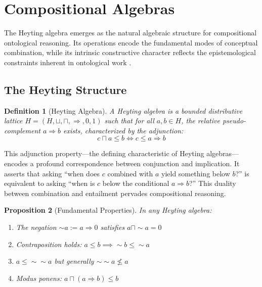 \documentclass[12pt,a4paper]{article}
\newtheorem{definition}{Definition}[section]
\newtheorem{proposition}[definition]{Proposition}
\begin{document}
\section{Compositional Algebras}

The Heyting algebra emerges as the natural algebraic structure for compositional ontological reasoning. Its operations encode the fundamental modes of conceptual combination, while its intrinsic constructive character reflects the epistemological constraints inherent in ontological work \citep{heyting1956}.

\subsection{The Heyting Structure}

\begin{definition}[Heyting Algebra]
A \emph{Heyting algebra} \citep{heyting1956, johnstone1982} is a bounded distributive lattice $H = (H, \sqcup, \sqcap, \Rightarrow, 0, 1)$ such that for all $a, b \in H$, the \emph{relative pseudo-complement} $a \Rightarrow b$ exists, characterized by the adjunction:
$$
c \sqcap a \leq b \iff c \leq a \Rightarrow b
$$
\end{definition}

This adjunction property---the defining characteristic of Heyting algebras---encodes a profound correspondence between conjunction and implication. It asserts that asking ``when does $c$ combined with $a$ yield something below $b$?'' is equivalent to asking ``when is $c$ below the conditional $a \Rightarrow b$?'' This duality between combination and entailment pervades compositional reasoning.

\begin{proposition}[Fundamental Properties]
In any Heyting algebra:
\begin{enumerate}[label=(\roman*)]
    \item The negation $\sim a := a \Rightarrow 0$ satisfies $a \sqcap \sim a = 0$
    \item Contraposition holds: $a \leq b \implies \sim b \leq \sim a$
    \item $a \leq \sim\sim a$ but generally $\sim\sim a \not\leq a$
    \item Modus ponens: $a \sqcap (a \Rightarrow b) \leq b$
\end{enumerate}
\end{proposition}
\end{document}
